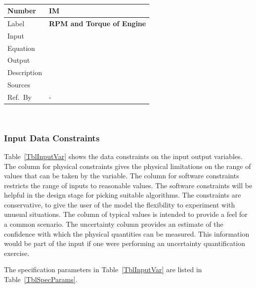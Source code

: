\documentclass[12pt]{article}
\newcommand{\colAwidth}{0.13\textwidth}
\newcommand{\colBwidth}{0.82\textwidth}
\newcounter{instnum} %
\newcommand{\definstance}[7] {
~\newline
\noindent
\begin{minipage}{\textwidth}
\renewcommand*{\arraystretch}{1.5}
\begin{tabular}{| p{\colAwidth} | p{\colBwidth}|}
  \hline
  \rowcolor[gray]{0.9}
  Number& IM\refstepcounter{instnum}\theinstnum \label{inst:\theinstnum}\\
  \hline
  Label& \bf #1 \\
  \hline
  Input& #2\\
  \hline
  Equation& #3\\
  \hline
  Output& #4\\
  \hline
  Description& #5 \\
  \hline
  Sources& #6 \\
  \hline
  Ref.\ By & #7\\
  \hline
\end{tabular}
\end{minipage}\\
}
\begin{document}
\definstance
{RPM and Torque of Engine}
{} %
{} %
{} %
{} %
{} %
{-}

\subsubsection{Input Data Constraints} \label{sec_DataConstraints}    

Table~\ref{TblInputVar} shows the data constraints on the input output
variables.  The column for physical constraints gives the physical limitations
on the range of values that can be taken by the variable.  The column for
software constraints restricts the range of inputs to reasonable values.  The
software constraints will be helpful in the design stage for picking suitable
algorithms.  The constraints are conservative, to give the user of the model the
flexibility to experiment with unusual situations.  The column of typical values
is intended to provide a feel for a common scenario.  The uncertainty column
provides an estimate of the confidence with which the physical quantities can be
measured.  This information would be part of the input if one were performing an
uncertainty quantification exercise.

The specification parameters in Table~\ref{TblInputVar} are listed in
Table~\ref{TblSpecParams}.
\end{document}
